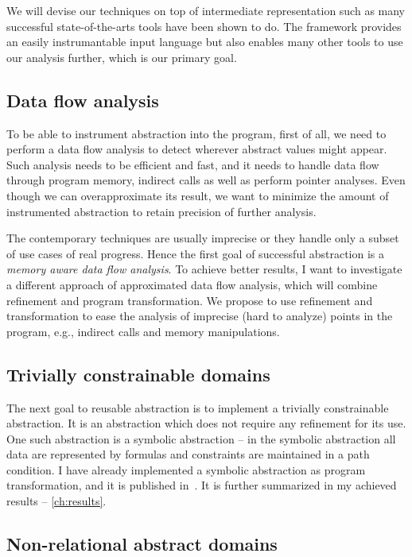 
We will devise our techniques on top of \llvm intermediate representation such
as many successful state-of-the-arts tools have been shown to do. The \llvm
framework provides an easily instrumantable input language but also enables
many other tools to use our analysis further, which is our primary goal.

\subsection{Data flow analysis}

To be able to instrument abstraction into the program, first of all, we need to
perform a data flow analysis to detect wherever abstract values might appear.
Such analysis needs to be efficient and fast, and it needs to handle data flow
through program memory, indirect calls as well as perform pointer analyses. Even though we can
overapproximate its result, we want to minimize the amount of instrumented
abstraction to retain precision of further analysis.

The contemporary techniques are usually imprecise or they handle only a subset of use
cases of real progress. Hence the first goal of successful abstraction is a
\emph{memory aware data flow analysis}. To achieve better results, I want to
investigate a different approach of approximated data flow analysis, which will
combine refinement and program transformation.  We propose to use refinement
and transformation to ease the analysis of imprecise (hard to analyze) points
in the program, e.g., indirect calls and memory manipulations.

\subsection{Trivially constrainable domains}

The next goal to reusable abstraction is to implement a trivially constrainable
abstraction. It is an abstraction which does not require any refinement for its
use. One such abstraction is a symbolic abstraction -- in the symbolic
abstraction all data are represented by formulas and constraints are maintained
in a path condition. I have already implemented a symbolic abstraction as
program transformation, and it is published in~\cite{Lauko2018SymComp}.
It is further summarized in my achieved results -- \autoref{ch:results}.

\subsection{Non-relational abstract domains}

